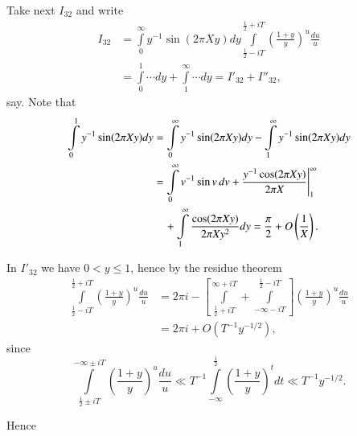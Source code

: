 Take next $I_{32}$ and write
\begin{align*}
  I_{32} & = \int\limits_0^\infty y^{-1} \sin (2 \pi X y) dy
  \int\limits_{\frac{1}{2}- iT}^{\frac{1}{2} + iT} \left(\frac{1+y}{y}
  \right)^u \frac{du}{u}\\
  & = \int\limits_0^1 \cdots dy + \int\limits_1^\infty \cdots dy =
  I'_{32} + I''_{32},
\end{align*}
say. Note that
\begin{align}
  \int\limits_0^1 y^{-1} \sin (2 \pi Xy) dy &= \int\limits_0^\infty
  y^{-1} \sin (2 \pi Xy) dy - \int\limits_1^\infty y^{-1} \sin (2 \pi
  X y) dy\notag\\
  & = \int\limits_0^\infty v^{-1} \sin v\, dv + \frac{y^{-1} \cos (2
    \pi Xy)}{2 \pi X}\Bigg|_1^\infty\notag\\
&\quad + \int\limits_1^\infty \frac{\cos (2 \pi Xy)}{2 \pi Xy^2} dy
   = \frac{\pi}{2} + O\left(\frac{1}{X} \right).\label{c2:eq2.60}
\end{align}

In $I'_{32}$ we have $0 < y \leq 1$, hence by the residue theorem
\begin{align*}
  \int\limits_{\frac{1}{2} - iT}^{\frac{1}{2} + iT}
  \left(\frac{1+y}{y}\right)^u \frac{du}{u} & = 2 \pi i - \left[
    \int\limits^{\infty + iT}_{\frac{1}{2} + iT}+ \int\limits_{-
      \infty - i T}^{\frac{1}{2} - i T}\right] \left(\frac{1+y}{y}
  \right)^u \frac{du}{u}\\
  & = 2 \pi i + O(T^{-1}y^{- 1/2}),
\end{align*}
since
$$
\int\limits_{\frac{1}{2} \pm iT}^{- \infty \pm i T}
\left(\frac{1+y}{y}\right)^u \frac{du}{u} \ll T^{-1} \int\limits_{-
  \infty}^{\frac{1}{2}} \left(\frac{1+y}{y}\right)^t dt \ll T^{-1}
y^{- 1/2}. 
$$

Hence 
  {}

